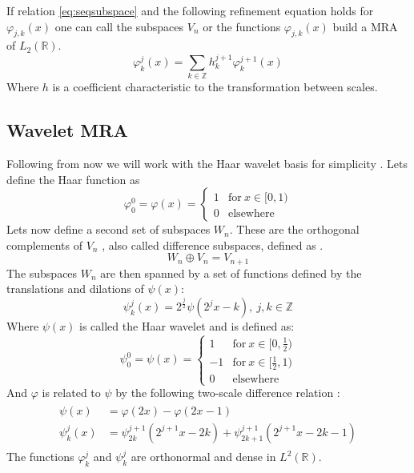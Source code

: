 \documentclass[../master_thesis.tex]{subfiles}
\begin{document}
If relation \ref{eq:seqsubspace} and the following refinement equation holds for $\varphi_{j,k}(x)$
one can call the subspaces $V_n$ or the functions $\varphi_{j,k}(x)$ build a \ac{MRA} of $L_2(\mathbb{R})$.
\begin{equation}
\varphi^j_k(x) = \sum_{k\in\mathbb{Z}} h^{j+1}_k\varphi^{j+1}_k(x)
\end{equation}
Where $h$ is a coefficient characteristic to the transformation between scales.
\subsection{Wavelet \ac{MRA}}
Following from now we will work with the Haar wavelet basis for simplicity \cite{Beylkin:MRA}.
Lets define the Haar function \cite{Schneider:2007} as
\begin{equation}
  \varphi^0_0 = \varphi(x) =
  \begin{cases}
  1 & \text{for} \ x\in [0,1)\\
  0 & \text{elsewhere}
\end{cases}
\end{equation}
Lets now define a second set of subspaces $W_n$. These are the orthogonal complements of $V_n$ \cite{Alpert1993}, also called difference subspaces,
defined as \cite{Beylkin:MRA, Sorland, Alpert1993}.
\begin{equation}
  W_n \oplus V_n = V_{n + 1} \label{eq:diffsubspace}
\end{equation}
The subspaces $W_n$ are then spanned by a set of functions defined by the translations and
dilations of $\psi(x)$:
\begin{equation}
  \psi_k^j(x) = 2^{\frac{j}{2}}\psi(2^jx - k),\  j,k \in \mathbb{Z} \label{eq:haarwavelet}
\end{equation}
Where $\psi(x)$ is called the Haar wavelet \cite{Schneider:2007} and is defined as:
\begin{equation}
  \psi^0_0 = \psi(x) =
  \begin{cases}
  1 & \text{for} \ x\in [0,\frac{1}{2})\\
  -1 & \text{for}\ x\in [\frac{1}{2}, 1)\\
  0 & \text{elsewhere}
\end{cases}
\end{equation}
And $ \varphi$ is related to $\psi$ by the following two-scale difference relation \cite{Beylkin:MRA, Schneider:2007, Sorland}:
\begin{align}
  \begin{split}\label{eq:2scalewavelet}
    \psi(x) &= \varphi(2x) - \varphi(2x - 1)\\
    \psi^j_k(x) &= \psi^{j+1}_{2k}(2^{j+1}x - 2k) + \psi^{j+1}_{2k+1}(2^{j+1}x - 2k - 1)
  \end{split}
\end{align}
The functions $\varphi^j_k$ and $\psi^j_k$ are orthonormal
and dense \cite{Beylkin:MRA, Sorland, SRJensen:2014} in $L^2(\mathbb{R})$.
\end{document}
